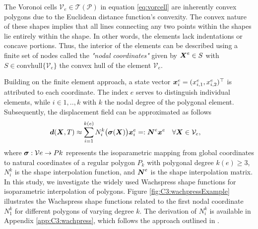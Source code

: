 %
The Voronoi cells $\mathcal{V}_e \in \mathcal{T}(\mathcal{P})$ in equation \eqref{eq:vorcell} are inherently convex polygons due to the Euclidean distance function's convexity. The convex nature of these shapes implies that all lines connecting any two points within the shapes lie entirely within the shape. In other words, the elements lack indentations or concave portions. Thus, the interior of the elements can be described using a finite set of nodes called the \textit{"nodal coordinates"} given by ${\boldsymbol{X}}^e \in S$ with $S \in \textrm{convhull}\{\mathcal{V}_e\}$ the convex hull of the element $\mathcal{V}_e$.

Building on the finite element approach, a state vector ${\boldsymbol{x}}^e_i = (x^e_{i,1}, x^e_{i,2})^\top$ is attributed to each coordinate. The index $e$ serves to distinguish individual elements, while $i \in {1,..,k}$ with $k$ the nodal degree of the polygonal element. Subsequently, the displacement field can be approximated as follows
%
\begin{align}
\dB(\XB,T) &\approx \sum^{k(e)}_{i=1} N_i^{k}\big(\sigmaB(\XB)\big) \xB^{e}_i  =: \NB^{e} \xB^{e} \quad \forall \XB \in \mathcal{V}_e,%
\end{align}
%
where $\boldsymbol{\sigma}: \mathcal{V}e \to P{k}$ represents the isoparametric mapping from global coordinates to natural coordinates of a regular polygon $P_{k}$ with polygonal degree $k(e) \ge 3$, $N^k_i$ is the shape interpolation function, and ${\boldsymbol{N}}^{e}$ is the shape interpolation matrix. In this study, we investigate the widely used Wachspress shape functions \cite{Sukumar2004Nov, Talischi2012, Talischi2012Mar, Floater2014Jun} for isoparametric interpolation of polygons. Figure \ref{fig:C3:wachpressExample} illustrates the Wachspress shape functions related to the first nodal coordinate $N^k_1$ for different polygons of varying degree $k$. The derivation of $N^k_i$ is available in Appendix \ref{app:C3:wachpress}, which follows the approach outlined in \cite{Talischi2012Mar, Floater2014Jun}.


